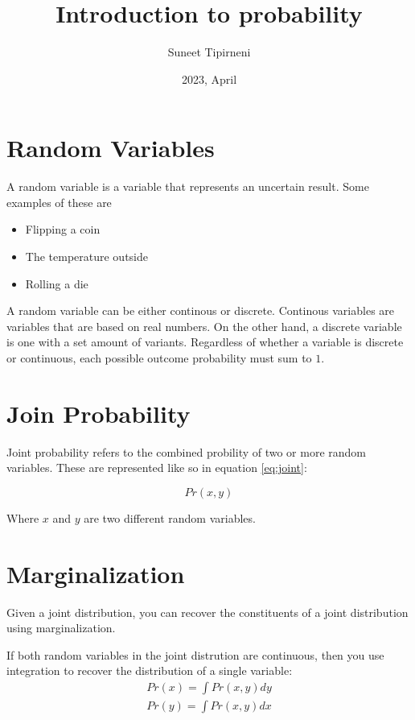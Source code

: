 \documentclass{article}
\title{Introduction to probability}
\date{2023, April}
\author{Suneet Tipirneni}
\begin{document}
\maketitle

\section{Random Variables}

A random variable is a variable that represents an uncertain result. Some examples of these are \par

\begin{itemize}
	\item Flipping a coin
	\item The temperature outside
	\item Rolling a die
\end{itemize}

A random variable can be either continous or discrete. Continous variables are variables that are based on real numbers. On the other hand, a discrete variable is one with a set amount of variants. Regardless of whether a variable is discrete or continuous, each possible outcome probability must sum to $1$.

\section{Join Probability}

Joint probability refers to the combined probility of two or more random variables. These are represented like so in equation \ref{eq:joint}:

\begin{equation} \label{eq:joint}
	Pr\left( x,y \right) 
\end{equation}

Where $x$ and $y$ are two different random variables.

\section{Marginalization}

Given a joint distribution, you can recover the constituents of a joint distribution using marginalization. 

If both random variables in the joint distrution are continuous, then you use integration to recover the distribution of a single variable:
\begin{align*}
	Pr\left( x \right)=\int Pr\left( x,y \right)dy \\
	Pr\left( y \right) = \int Pr\left( x,y \right)dx
\end{align*}
\end{document}
